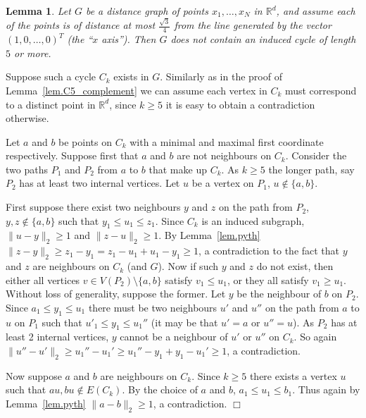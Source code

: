 \documentclass{article}
\newenvironment{proof}{\noindent{\bf Proof}}{\hspace*{\fill}$\Box$}
\newtheorem{lemma} [theorem] {Lemma}\newtheorem{attempt} [theorem] {Attempt}\newtheorem{corollary} [theorem] {Corollary}\newtheorem{prop} [theorem] {Proposition}\newtheorem{definition} [theorem] {Definition}\newtheorem{remark} [theorem] {Remark}\newtheorem{conjecture} [theorem] {Conjecture}\newtheorem{claim} [theorem] {Claim}
\begin{document}
\begin{lemma}\label{lem.C5}
    Let $G$ be a distance graph of points $x_1, \dots, x_N$ in $\mathbb{R}^d$,
    and assume each of the points is of distance at most $\frac {\sqrt 3} 4$
    from the line generated by the vector $(1, 0, \dots,0)^T$ (the ``$x$ axis''). 
    Then $G$ does not contain
    an induced cycle of length $5$ or more.
\end{lemma}
\begin{proof}
    Suppose such a cycle $C_k$ exists in $G$. 
    Similarly as in the proof of Lemma~\ref{lem.C5_complement}
    we can assume each vertex in $C_k$ must correspond to a distinct
    point in $\mathbb{R}^d$, since $k\ge 5$ it is easy to obtain a contradiction otherwise.
    
    Let $a$ and $b$ be points on $C_k$ with a minimal and maximal first coordinate respectively.
    Suppose first that $a$ and $b$ are not neighbours on $C_k$.
    Consider the two paths $P_1$ and $P_2$ from $a$ to $b$ that make up $C_k$.
    As $k \ge 5$ the longer path, say $P_2$ has at least two internal vertices.
    Let $u$ be a vertex on $P_1$, $u \not \in \{a,b\}$.
    
First suppose there exist two neighbours $y$ and $z$ on the path from $P_2$, $y,z \not \in \{a,b\}$ such that $y_1 \le u_1 \le z_1$.
    Since $C_k$ is an induced
    subgraph, $\|u-y\|_2 \ge 1$ and $\|z-u\|_2 \ge 1$. By Lemma~\ref{lem.pyth}
    $\|z-y\|_2 \ge z_1 - y_1 = z_1 - u_1 + u_1 - y_1 \ge 1$,
    a contradiction to the fact that $y$ and $z$ are neighbours on $C_k$ (and $G$). Now if such $y$ and $z$ do not exist, then either all vertices $v \in V(P_2) \setminus \{a,b\}$ satisfy $v_1 \le u_1$, or they all satisfy $v_1 \ge u_1$. Without loss of generality, suppose the former. Let $y$ be the neighbour of $b$ on $P_2$. Since $a_1 \le y_1 \le u_1$ there must be two neighbours $u'$ and $u''$ on the path from $a$ to $u$ on $P_1$ such that $u'_1 \le y_1 \le u_1''$ (it may be that $u'=a$ or $u''=u$). As $P_2$ has at least 2 internal vertices, $y$ cannot be a neighbour of $u'$ or $u''$ on $C_k$. So again $\|u'' - u'\|_2 \ge u_1'' - u_1' \ge u_1'' - y_1 + y_1 - u_1' \ge 1$, a contradiction.

    Now suppose $a$ and $b$ are neighbours on $C_k$. Since $k \ge 5$ there exists
    a vertex $u$ such that $au, bu \not \in E(C_k)$. By the choice of $a$ and $b$,
    $a_1 \le u_1 \le b_1$. Thus again by Lemma~\ref{lem.pyth} $\|a-b\|_2 \ge 1$, a contradiction.
\end{proof}
\end{document}
